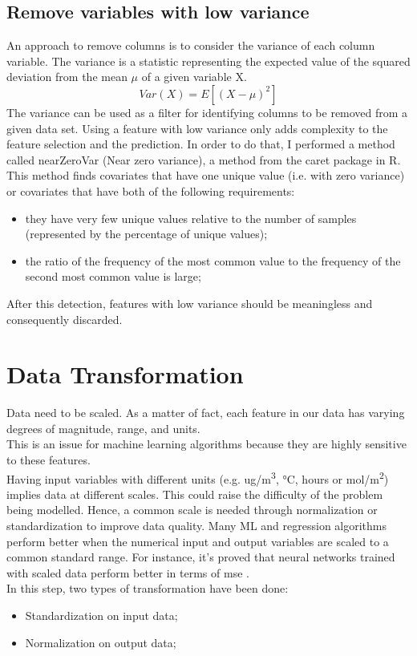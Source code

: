 \subsection{Remove variables with low variance}
An approach to remove columns is to consider the variance of each column variable. The variance is a statistic representing the expected value of the squared deviation from the mean $\mu$ of a given variable X. 
\begin{equation}
  Var(X) = E[(X-\mu)^2]
\end{equation}
The variance can be used as a filter for identifying columns to be removed from a given data set. 
Using a feature with low variance only adds complexity to the feature selection and the prediction.\newline
In order to do that, I performed a method called nearZeroVar (Near zero variance), a method from the \gls{caret} \cite{caret} package in R.\\
This method finds covariates that have one unique value (i.e. with zero variance) or covariates that have both of the following requirements:
\begin{itemize}
\item they have very few unique values relative to the number of samples (represented by the percentage of unique values);
\item the ratio of the frequency of the most common value to the frequency of the second most common value is large;
\end{itemize}
After this detection, features with low variance should be meaningless and consequently discarded. 
\section{Data Transformation}
Data need to be scaled. As a matter of fact, each feature in our data has varying degrees of magnitude, range, and units. \\This is an issue for machine learning algorithms because they are highly sensitive to these features.\\ 
Having input variables with different units (e.g. ug/m\textsuperscript{3}, °C, hours or mol/m\textsuperscript{2}) implies data at different scales. This could raise the difficulty of the problem being modelled. \newline
Hence, a common scale is needed through normalization or standardization to improve data quality.\newline
Many ML and regression algorithms perform better when the numerical input and output variables are scaled to a common standard range. \newline
For instance, it's proved that neural networks trained with scaled data perform better in terms of \gls{mse}  \cite{shanker1996effect}.\\
In this step, two types of transformation have been done:
\begin{itemize}
    \item Standardization on input data;
    \item Normalization on output data;
\end{itemize}
